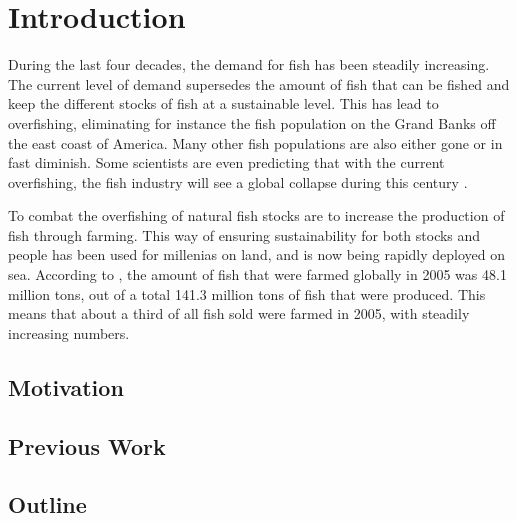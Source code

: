 
\chapter{Introduction}
During the last four decades, the demand for fish 
has been steadily increasing. The current level 
of demand supersedes the amount of fish that 
can be fished and keep the different stocks of 
fish at a sustainable level. This has lead to 
overfishing, eliminating for instance the 
fish population on the Grand Banks off the east 
coast of America. Many other fish 
populations are also either gone or in fast 
diminish. Some scientists are even predicting 
that with the current overfishing, the fish industry will 
see a global collapse during this century \citet{worm06}.

To combat the overfishing of natural fish stocks are to increase 
the production of fish through farming. This way of ensuring 
sustainability for both stocks and people has been 
used for millenias on land, and is now being rapidly 
deployed on sea. According to \citet{fao06}, the amount of 
fish that were farmed globally in 2005 was 48.1 million tons, out of 
a total 141.3 million tons of fish that were produced. This 
means that about a third of all fish sold were farmed in 2005, with 
steadily increasing numbers.




\section{Motivation}


\section{Previous Work}


\section{Outline}

